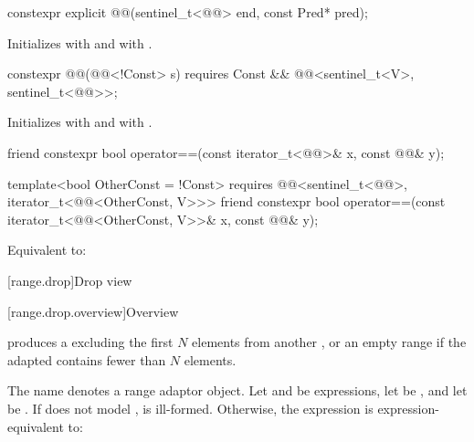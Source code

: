 %
\begin{itemdecl}
constexpr explicit @@(sentinel_t<@@> end, const Pred* pred);
\end{itemdecl}

\begin{itemdescr}
\pnum
\effects
Initializes  with  and  with .
\end{itemdescr}

%
\begin{itemdecl}
constexpr @@(@@<!Const> s)
  requires Const && @@<sentinel_t<V>, sentinel_t<@@>>;
\end{itemdecl}

\begin{itemdescr}
\pnum
\effects
Initializes  with  and
 with .
\end{itemdescr}

%
\begin{itemdecl}
friend constexpr bool operator==(const iterator_t<@@>& x, const @@& y);

template<bool OtherConst = !Const>
  requires @@<sentinel_t<@@>, iterator_t<@@<OtherConst, V>>>
friend constexpr bool operator==(const iterator_t<@@<OtherConst, V>>& x,
                                 const @@& y);
\end{itemdecl}

\begin{itemdescr}
\pnum
\effects
Equivalent to:
\end{itemdescr}

[range.drop]{Drop view}

[range.drop.overview]{Overview}

\pnum
{} produces a 
excluding the first $N$ elements from another , or
an empty range if the adapted  contains fewer than $N$ elements.

\pnum
{}%
The name  denotes
a range adaptor object.
Let  and  be expressions,
let  be , and
let  be .
If  does not model
,
 is ill-formed.
Otherwise, the expression 
is expression-equivalent to:

